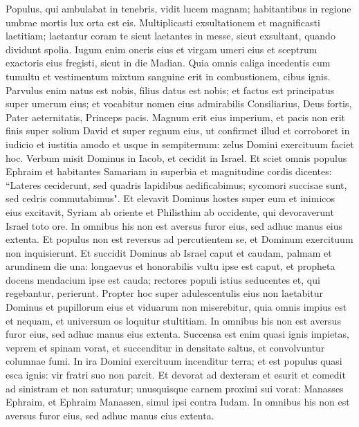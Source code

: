\begin{biblechapter}  
\verse Populus, qui ambulabat in tenebris, vidit lucem magnam; habitantibus in regione umbrae mortis lux orta est eis. 
\verse Multiplicasti exsultationem et magnificasti laetitiam; laetantur coram te sicut laetantes in messe, sicut exsultant, quando dividunt spolia. 
\verse Iugum enim oneris eius et virgam umeri eius et sceptrum exactoris eius fregisti, sicut in die Madian. 
\verse Quia omnis caliga incedentis cum tumultu et vestimentum mixtum sanguine erit in combustionem, cibus ignis. 
\verse Parvulus enim natus est nobis, filius datus est nobis; et factus est principatus super umerum eius; et vocabitur nomen eius admirabilis Consiliarius, Deus fortis, Pater aeternitatis, Princeps pacis. 
\verse Magnum erit eius imperium, et pacis non erit finis super solium David et super regnum eius, ut confirmet illud et corroboret in iudicio et iustitia amodo et usque in sempiternum: zelus Domini exercituum faciet hoc. 
\verse Verbum misit Dominus in Iacob, et cecidit in Israel. 
\verse Et sciet omnis populus Ephraim et habitantes Samariam in superbia et magnitudine cordis dicentes: 
\verse “Lateres ceciderunt, sed quadris lapidibus aedificabimus; sycomori succisae sunt, sed cedris commutabimus". 
\verse Et elevavit Dominus hostes super eum et inimicos eius excitavit, 
\verse Syriam ab oriente et Philisthim ab occidente, qui devoraverunt Israel toto ore. In omnibus his non est aversus furor eius, sed adhuc manus eius extenta. 
\verse Et populus non est reversus ad percutientem se, et Dominum exercituum non inquisierunt. 
\verse Et succidit Dominus ab Israel caput et caudam, palmam et arundinem die una: 
\verse longaevus et honorabilis vultu ipse est caput, et propheta docens mendacium ipse est cauda; 
\verse rectores populi istius seducentes et, qui regebantur, perierunt. 
\verse Propter hoc super adulescentulis eius non laetabitur Dominus et pupillorum eius et viduarum non miserebitur, quia omnis impius est et nequam, et universum os loquitur stultitiam. In omnibus his non est aversus furor eius, sed adhuc manus eius extenta. 
\verse Succensa est enim quasi ignis impietas, veprem et spinam vorat, et succenditur in densitate saltus, et convolvuntur columnae fumi. 
\verse In ira Domini exercituum incenditur terra; et est populus quasi esca ignis: vir fratri suo non parcit. 
\verse Et devorat ad dexteram et esurit et comedit ad sinistram et non saturatur; unusquisque carnem proximi sui vorat: 
\verse Manasses Ephraim, et Ephraim Manassen, simul ipsi contra Iudam. In omnibus his non est aversus furor eius, sed adhuc manus eius extenta. 
\end{biblechapter}

